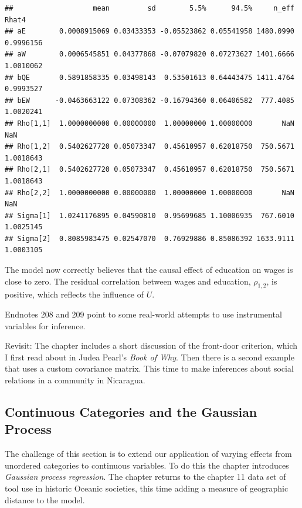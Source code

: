 \documentclass[
]{book}
\begin{document}
\begin{verbatim}
##                   mean         sd        5.5%      94.5%     n_eff     Rhat4
## aE        0.0008915069 0.03433353 -0.05523862 0.05541958 1480.0990 0.9996156
## aW        0.0006545851 0.04377868 -0.07079820 0.07273627 1401.6666 1.0010062
## bQE       0.5891858335 0.03498143  0.53501613 0.64443475 1411.4764 0.9993527
## bEW      -0.0463663122 0.07308362 -0.16794360 0.06406582  777.4085 1.0020241
## Rho[1,1]  1.0000000000 0.00000000  1.00000000 1.00000000       NaN       NaN
## Rho[1,2]  0.5402627720 0.05073347  0.45610957 0.62018750  750.5671 1.0018643
## Rho[2,1]  0.5402627720 0.05073347  0.45610957 0.62018750  750.5671 1.0018643
## Rho[2,2]  1.0000000000 0.00000000  1.00000000 1.00000000       NaN       NaN
## Sigma[1]  1.0241176895 0.04590810  0.95699685 1.10006935  767.6010 1.0025145
## Sigma[2]  0.8085983475 0.02547070  0.76929886 0.85086392 1633.9111 1.0003105
\end{verbatim}

The model now correctly believes that the causal effect of education on wages is close to zero. The residual correlation between wages and education, \(\rho_{1,2}\), is positive, which reflects the influence of \(U\).

Endnotes 208 and 209 point to some real-world attempts to use instrumental variables for inference.

Revisit: The chapter includes a short discussion of the front-door criterion, which I first read about in Judea Pearl's \emph{Book of Why}. Then there is a second example that uses a custom covariance matrix. This time to make inferences about social relations in a community in Nicaragua.

\hypertarget{continuous-categories-and-the-gaussian-process}{%
\subsection*{Continuous Categories and the Gaussian Process}\label{continuous-categories-and-the-gaussian-process}}

The challenge of this section is to extend our application of varying effects from unordered categories to continuous variables. To do this the chapter introduces \emph{Gaussian process regression}. The chapter returns to the chapter 11 data set of tool use in historic Oceanic societies, this time adding a measure of geographic distance to the model.
\end{document}
